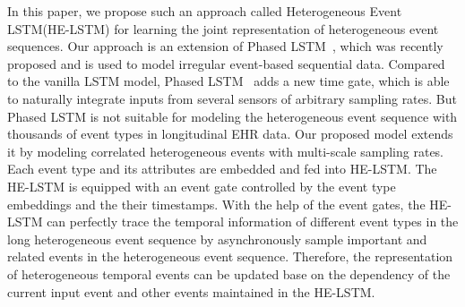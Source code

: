 \documentclass[letterpaper]{article} %
\begin{document}






In this paper, we propose such an approach called Heterogeneous Event LSTM(HE-LSTM) for learning the joint representation of heterogeneous event sequences. Our approach is an extension of Phased LSTM~\cite{neil2016phased}, which was recently proposed and is used to model irregular event-based sequential data. Compared to the vanilla LSTM model, Phased LSTM~\cite{neil2016phased}  adds a new time gate, which is able to naturally integrate inputs from several sensors of arbitrary sampling rates. But Phased LSTM is not suitable for modeling the heterogeneous event sequence with thousands of event types in longitudinal EHR data. Our proposed model extends it by modeling correlated heterogeneous events with multi-scale sampling rates. 
Each event type and its attributes are embedded and fed into HE-LSTM. The HE-LSTM is equipped with an event gate controlled by the event type embeddings and the their timestamps.
With the help of the event gates, the HE-LSTM can perfectly trace the temporal information of different event types in the long heterogeneous event sequence
by asynchronously sample important and related events in the heterogeneous event sequence. 
Therefore, the representation of heterogeneous temporal events can be updated base on the dependency of the current input event and other events maintained in the HE-LSTM.
 
\end{document}
